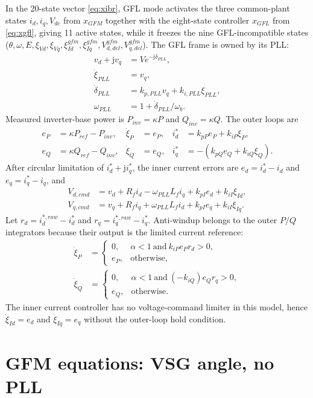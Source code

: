 \documentclass[12pt,a4paper]{article}
\begin{document}
In the 20-state vector \eqref{eq:xibr}, GFL mode activates the three common-plant states
$i_d,i_q,V_{dc}$ from $x_{GFM}$ together with the eight-state controller $x_{GFL}$ from
\eqref{eq:xgfl}, giving 11 active states, while it freezes the nine GFL-incompatible states
($\theta,\omega,E,\xi_{Vd},\xi_{Vq},\xi_{Id}^{gfm},\xi_{Iq}^{gfm},V_{d,del}^{gfm},V_{q,del}^{gfm}$).
The GFL frame is owned by its PLL:
\begin{align}
v_d+\mathrm{j}v_q&=Ve^{-\mathrm{j}\delta_{PLL}},\\
\dot\xi_{PLL}&=v_q,\\
\dot\delta_{PLL}&=k_{p,PLL}v_q+k_{i,PLL}\xi_{PLL},\\
\omega_{PLL}&=1+\dot\delta_{PLL}/\omega_b.
\end{align}
Measured inverter-base power is $P_{inv}=\kappa P$ and $Q_{inv}=\kappa Q$. The outer loops are
\begin{align}
e_P&=\kappa P_{ref}-P_{inv}, & \dot\xi_P&=e_P,
&i_d^*&=k_{pP}e_P+k_{iP}\xi_P,\\
e_Q&=\kappa Q_{ref}-Q_{inv}, & \dot\xi_Q&=e_Q,
&i_q^*&=-(k_{pQ}e_Q+k_{iQ}\xi_Q).
\end{align}
After circular limitation of $i_d^*+\mathrm{j}i_q^*$, the inner current errors are
$e_d=i_d^*-i_d$ and $e_q=i_q^*-i_q$, and
\begin{align}
V_{d,cmd}&=v_d+R_fi_d-\omega_{PLL}L_fi_q+k_{pI}e_d+k_{iI}\xi_{Id},\\
V_{q,cmd}&=v_q+R_fi_q+\omega_{PLL}L_fi_d+k_{pI}e_q+k_{iI}\xi_{Iq}.
\end{align}
Let $r_d=i_d^{*,raw}-i_d^*$ and $r_q=i_q^{*,raw}-i_q^*$. Anti-windup belongs to the outer
$P/Q$ integrators because their output is the limited current reference:
\begin{align}
\dot\xi_P&=\begin{cases}0,&\alpha<1\ \text{and}\ k_{iP}e_Pr_d>0,\\e_P,&\text{otherwise},\end{cases}\\
\dot\xi_Q&=\begin{cases}0,&\alpha<1\ \text{and}\ (-k_{iQ})e_Qr_q>0,\\e_Q,&\text{otherwise}.\end{cases}
\end{align}
The inner current controller has no voltage-command limiter in this model, hence
$\dot\xi_{Id}=e_d$ and $\dot\xi_{Iq}=e_q$ without the outer-loop hold condition.

\section{GFM equations: VSG angle, no PLL}
\end{document}
